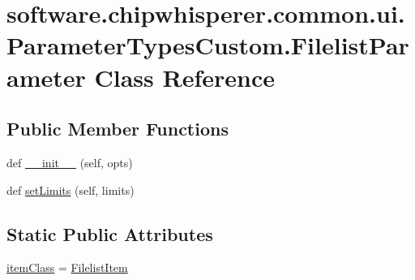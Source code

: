 \hypertarget{classsoftware_1_1chipwhisperer_1_1common_1_1ui_1_1ParameterTypesCustom_1_1FilelistParameter}{}\section{software.\+chipwhisperer.\+common.\+ui.\+Parameter\+Types\+Custom.\+Filelist\+Parameter Class Reference}
\label{classsoftware_1_1chipwhisperer_1_1common_1_1ui_1_1ParameterTypesCustom_1_1FilelistParameter}
\subsection*{Public Member Functions}
\begin{DoxyCompactItemize}
\item 
def \hyperlink{classsoftware_1_1chipwhisperer_1_1common_1_1ui_1_1ParameterTypesCustom_1_1FilelistParameter_a04373432d31620a1a68471eaf22b6699}{\+\_\+\+\_\+init\+\_\+\+\_\+} (self, opts)
\item 
def \hyperlink{classsoftware_1_1chipwhisperer_1_1common_1_1ui_1_1ParameterTypesCustom_1_1FilelistParameter_ad8e2caa0e4ac95df00d43da9e5e65903}{set\+Limits} (self, limits)
\end{DoxyCompactItemize}
\subsection*{Static Public Attributes}
\begin{DoxyCompactItemize}
\item 
\hyperlink{classsoftware_1_1chipwhisperer_1_1common_1_1ui_1_1ParameterTypesCustom_1_1FilelistParameter_ab3b4b9f74d56f2dc63054dcdce422314}{item\+Class} = \hyperlink{classsoftware_1_1chipwhisperer_1_1common_1_1ui_1_1ParameterTypesCustom_1_1FilelistItem}{Filelist\+Item}
\end{DoxyCompactItemize}


